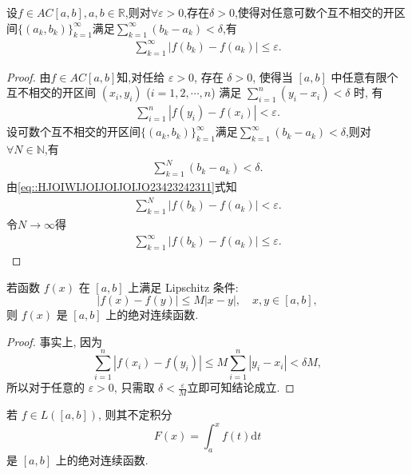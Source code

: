 \documentclass[../../main.tex]{subfiles}%
\begin{document}
\begin{proposition}\label{proposition:绝对连续函数对至多可数个开区间也成立}
设$f\in AC[a,b],a,b\in \mathbb{R}$,则对$\forall \varepsilon >0$,存在$\delta>0$,使得对任意可数个互不相交的开区间$\{(a_k,b_k)\}_{k=1}^{\infty}$满足$\sum\limits_{k=1}^{\infty}(b_k-a_k)<\delta$,有
\begin{align*}
\sum\limits_{k=1}^{\infty}\left|f(b_k)-f(a_k)\right|\leqslant \varepsilon .
\end{align*}
\end{proposition}
\begin{proof}
由$f\in AC[a,b]$知,对任给 $\varepsilon>0$, 存在 $\delta>0$, 使得当 $[a,b]$ 中任意有限个互不相交的开区间 $(x_i,y_i)$ ($i=1,2,\cdots,n$) 满足 $\sum_{i=1}^n (y_i-x_i) < \delta$ 时, 有
\begin{align}\label{eq::HJOIWIJOIJOIJOIJO23423242311}
\sum_{i=1}^n |f(y_i)-f(x_i)| < \varepsilon.
\end{align}
设可数个互不相交的开区间$\{(a_k,b_k)\}_{k=1}^{\infty}$满足$\sum\limits_{k=1}^{\infty}(b_k-a_k)<\delta$,则对$\forall N \in \mathbb{N}$,有
\begin{align*}
\sum\limits_{k=1}^{N}(b_k-a_k)<\delta.
\end{align*}
由\eqref{eq::HJOIWIJOIJOIJOIJO23423242311}式知
\begin{align*}
\sum_{k=1}^N |f(b_k)-f(a_k)| < \varepsilon.
\end{align*}
令$N\to \infty$得
\begin{align*}
\sum\limits_{k=1}^{\infty}\left|f(b_k)-f(a_k)\right|\leqslant \varepsilon .
\end{align*}
\end{proof}

\begin{proposition}\label{proposition:Lipschitz连续一定绝对连续}
若函数 $f(x)$ 在 $[a,b]$ 上满足 Lipschitz 条件:
\[
|f(x)-f(y)| \leqslant M|x-y|,\quad x,y\in[a,b],
\]
则 $f(x)$ 是 $[a,b]$ 上的绝对连续函数. 
\end{proposition}
\begin{proof}
事实上, 因为
\[
\sum_{i=1}^n |f(x_i)-f(y_i)| \leqslant M\sum_{i=1}^n |y_i-x_i| < \delta M,
\]
所以对于任意的 $\varepsilon>0$, 只需取 $\delta<\frac{\varepsilon}{M}$立即可知结论成立.
\end{proof}

\begin{theorem}
若 $f\in L([a,b])$, 则其不定积分
\[
F(x) = \int_a^x f(t)\mathrm{d}t
\]
是 $[a,b]$ 上的绝对连续函数.
\end{theorem}
\end{document}
